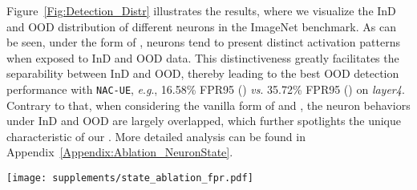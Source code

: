 \documentclass{article} \usepackage{iclr2024_conference,times}
\newcommand{\eg}{\textit{e}.\textit{g}.}
\begin{document}
Figure~\ref{Fig:Detection_Distr} illustrates the results, where we visualize the InD and OOD distribution of different neurons in the ImageNet benchmark. 
As can be seen, under the form of , neurons tend to present distinct activation patterns when exposed to InD and OOD data. 
This distinctiveness greatly facilitates the separability between InD and OOD, thereby leading to the best OOD detection performance with \texttt{NAC-UE}, \eg, 16.58\% FPR95 () \textit{vs}. 35.72\% FPR95 () on \textit{layer4}.
Contrary to that, when considering the vanilla form of  and , the neuron behaviors under InD and OOD are largely overlapped, which further spotlights the unique characteristic of our .  More detailed analysis can be found in Appendix~\ref{Appendix:Ablation_NeuronState}.



























\begin{figure*}
	[t]
	\centering \texttt{[image: supplements/state\_ablation\_fpr.pdf]} \vspace{-2mm}
	\caption{Ablation studies on the neuron activation state. We visualize InD (ImageNet) and OOD (iNaturalist) distributions \textit{w.r.t.} (a) neuron output, ; (b) KL gradients of neuron output, ; (c) our defined neuron state, . All states are normalized via the sigmoid function.}
	\label{Fig:Detection_Distr}
	\vspace{-2mm}
\end{figure*}
\end{document}
